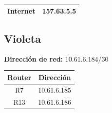 \begin{table}[!htbp]
\centering
  \begin{tabular}{|c|c|}
    \hline
	Internet& 157.63.5.5 \\
    \hline
  \end{tabular}
\end{table}

\subsection{Violeta}
\textbf{Dirección de red:} 10.61.6.184/30
\begin{table}[!htbp]
\centering
  \begin{tabular}{|c|c|}
    \hline
	Router & Dirección\\ \hline
	R7 &10.61.6.185\\ \hline
	R13 &10.61.6.186\\
    \hline
  \end{tabular}
\end{table}

